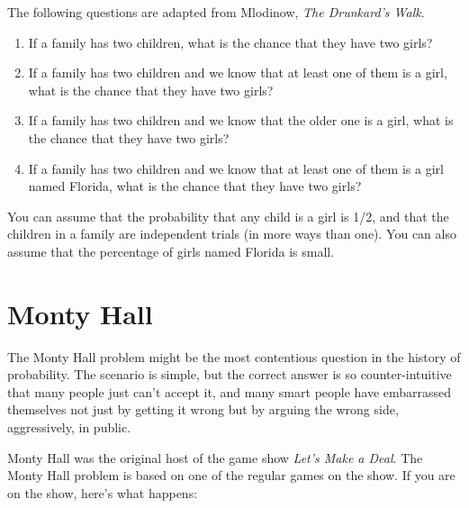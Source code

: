 \documentclass[12pt]{book}
\begin{document}
\begin{exercise}
The following questions are adapted from Mlodinow, {\em The Drunkard's
  Walk}.

\begin{enumerate}

\item If a family has two children, what is the chance that they
  have two girls?

\item If a family has two children and we know that at least one of
  them is a girl, what is the chance that they have two girls?

\item If a family has two children and we know that the older one is a
  girl, what is the chance that they have two girls?

\item If a family has two children and we know that at least one of
  them is a girl named Florida, what is the chance that they have
  two girls?

\end{enumerate}

You can assume that the probability that any child is a girl is 1/2,
and that the children in a family are independent trials (in more ways
than one).  You can also assume that the percentage of girls named
Florida is small.

\end{exercise}


\section{Monty Hall}

The Monty Hall problem might be the most contentious question in
the history of probability.  The scenario is simple, but the correct
answer is so counter-intuitive that many people just can't accept
it, and many smart people have embarrassed themselves not just by
getting it wrong but by arguing the wrong side, aggressively,
in public.

Monty Hall was the original host of the game show {\em Let's Make a
Deal}.  The Monty Hall problem is based on one of the regular
games on the show.  If you are on the show, here's what happens:
\end{document}
